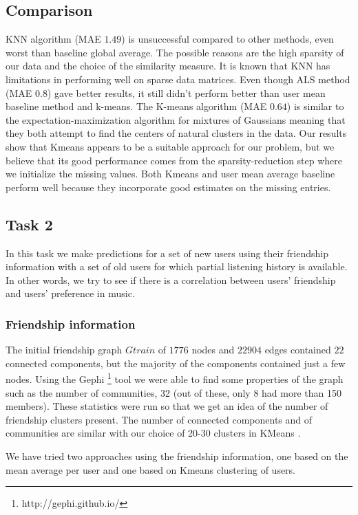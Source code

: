 \subsection{Comparison}

KNN algorithm (MAE $1.49$) is unsuccessful compared to other methods, even worst than baseline global average. The possible reasons are the high sparsity of our data and the choice of the similarity measure. It is known that KNN has limitations in performing well on sparse data matrices. Even though ALS method (MAE $0.8$) gave better results, it still didn't perform better than user mean baseline method and k-means. The K-means algorithm (MAE $0.64$) is similar to the expectation-maximization algorithm for mixtures of Gaussians meaning that they both attempt to find the centers of natural clusters in the data. Our results show that Kmeans appears to be a suitable approach for our problem, but we believe that its good performance comes from the sparsity-reduction step where we initialize the missing values. Both Kmeans and user mean average baseline perform well because they incorporate good estimates on the missing entries.

\subsection{Task 2}
In this task we make predictions for a set of new users using their friendship information with a set of old users for which partial listening history is available. In other words, we try to see if there is a correlation between
users' friendship and users' preference in music.

\subsubsection{Friendship information}
The initial friendship graph $Gtrain$ of $1776$ nodes and $22904$ edges contained $22$ connected components, but the majority of the components contained just a few nodes.
Using the Gephi  \footnote{http://gephi.github.io/} tool we were able to find some properties of the graph such as the number of communities, 32 (out of these, only 8  had more than 150 members).
These statistics were run so that we get an idea of the number of friendship clusters present. The number of connected components and of communities are similar with our choice of 20-30 clusters in KMeans .

We have tried two approaches using the friendship information, one based on the mean average per user and one based on Kmeans clustering of users.

